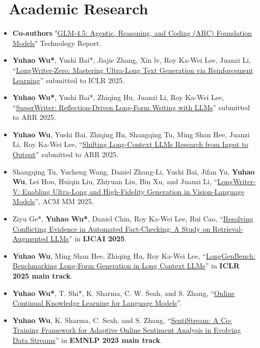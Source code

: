 \documentclass{resume}
\begin{document}
\section{\faCogs\ Academic Research}
\begin{itemize}[parsep=0.5ex]
    \item \textbf{Co-authors} "\href{https://scholar.google.com/scholar?q=GLM-4.5%3A+Agentic%2C+Reasoning%2C+and+Coding+%28ARC%29+Foundation+Models}{GLM-4.5: Agentic, Reasoning, and Coding (ARC) Foundation Models}" Technology Report.
    \item \textbf{Yuhao Wu*}, Yushi Bai*, Jiajie Zhang, Xin lv, Roy Ka-Wei Lee, Juanzi Li, “\href{https://scholar.google.com/scholar?q=LongWriter-Zero%3A+Mastering+Ultra-Long+Text+Generation+via+Reinforcement+Learning}{LongWriter-Zero: Mastering Ultra-Long Text Generation via Reinforcement Learning}” submitted to ICLR 2025.
    \item \textbf{Yuhao Wu*}, Yushi Bai*, Zhiqing Hu, Juanzi Li, Roy Ka-Wei Lee, “\href{https://scholar.google.com/scholar?q=SuperWriter%3A+Reflection-Driven+Long-Form+Writing+with+LLMs}{SuperWriter: Reflection-Driven Long-Form Writing with LLMs}” submitted to ARR 2025.
    \item \textbf{Yuhao Wu}, Yushi Bai, Zhiqing Hu, Shangqing Tu, Ming Shan Hee, Juanzi Li, Roy Ka-Wei Lee, “\href{https://scholar.google.com/scholar?q=Shifting+Long-Context+LLMs+Research+from+Input+to+Output}{Shifting Long-Context LLMs Research from Input to Output}” submitted to ARR 2025.
    \item Shangqing Tu, Yucheng Wang, Daniel Zhang-Li, Yushi Bai, Jifan Yu, \textbf{Yuhao Wu}, Lei Hou, Huiqin Liu, Zhiyuan Liu, Bin Xu, and Juanzi Li, “\href{https://scholar.google.com/scholar?q=LongWriter-V%3A+Enabling+Ultra-Long+and+High-Fidelity+Generation+in+Vision-Language+Models}{LongWriter-V: Enabling Ultra-Long and High-Fidelity Generation in Vision-Language Models}”, ACM MM 2025.
    \item Ziyu Ge*, \textbf{Yuhao Wu*}, Daniel Chin, Roy Ka-Wei Lee, Rui Cao, “\href{https://scholar.google.com/scholar?q=Resolving+Conflicting+Evidence+in+Automated+Fact-Checking%3A+A+Study+on+Retrieval-Augmented+LLMs}{Resolving Conflicting Evidence in Automated Fact-Checking: A Study on Retrieval-Augmented LLMs}” in \textbf{IJCAI 2025}.
    \item \textbf{Yuhao Wu}, Ming Shan Hee, Zhiqing Hu, Roy Ka-Wei Lee, “\href{https://scholar.google.com/scholar?q=LongGenBench%3A+Benchmarking+Long-Form+Generation+in+Long+Context+LLMs}{LongGenBench: Benchmarking Long-Form Generation in Long Context LLMs}” in \textbf{ICLR 2025 main track}.
    \item \textbf{Yuhao Wu*}, T. Shi*, K. Sharma, C. W. Seah, and S. Zhang, “\href{https://arxiv.org/abs/2311.09632}{Online Continual Knowledge Learning for Language Models}”.
    \item \textbf{Yuhao Wu}, K. Sharma, C. Seah, and S. Zhang, “\href{https://aclanthology.org/2023.emnlp-main.380}{SentiStream: A Co-Training Framework for Adaptive Online Sentiment Analysis in Evolving Data Streams}” in \textbf{EMNLP 2023 main track}.
\end{itemize}
\end{document}
